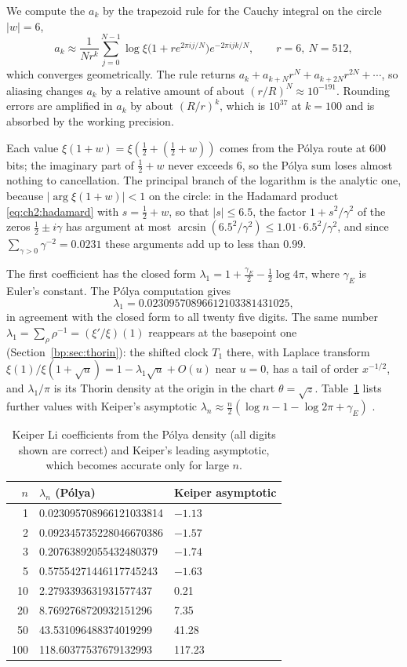 We compute the $a_k$ by the trapezoid rule for the Cauchy integral on the circle $|w|=6$,
\[
a_k\approx\frac1{Nr^k}\sum_{j=0}^{N-1}\log\xi\big(1+re^{2\pi ij/N}\big)e^{-2\pi ijk/N},\qquad r=6,\ N=512,
\]
which converges geometrically. The rule returns $a_k+a_{k+N}r^N+a_{k+2N}r^{2N}+\cdots$, so aliasing changes $a_k$ by a relative amount of about $(r/R)^N\approx10^{-191}$. Rounding errors are amplified in $a_k$ by about $(R/r)^k$, which is $10^{37}$ at $k=100$ and is absorbed by the working precision.

Each value $\xi(1+w)=\xi(\frac12+(\frac12+w))$ comes from the P\'olya route at $600$ bits; the imaginary part of $\frac12+w$ never exceeds $6$, so the P\'olya sum loses almost nothing to cancellation. The principal branch of the logarithm is the analytic one, because $|\arg\xi(1+w)|<1$ on the circle: in the Hadamard product \eqref{eq:ch2:hadamard} with $s=\frac12+w$, so that $|s|\le6.5$, the factor $1+s^2/\gamma^2$ of the zeros $\frac12\pm i\gamma$ has argument at most $\arcsin(6.5^2/\gamma^2)\le1.01\cdot6.5^2/\gamma^2$, and since $\sum_{\gamma>0}\gamma^{-2}=0.0231$ these arguments add up to less than $0.99$.

The first coefficient has the closed form $\lambda_1=1+\frac{\gamma_E}2-\frac12\log4\pi$, where $\gamma_E$ is Euler's constant. The P\'olya computation gives
\[
\lambda_1=0.02309570896612103381431025,
\]
in agreement with the closed form to all twenty five digits. The same number $\lambda_1=\sum_\rho\rho^{-1}=(\xi'/\xi)(1)$ reappears at the basepoint one (Section~\ref{bp:sec:thorin}): the shifted clock $T_1$ there, with Laplace transform $\xi(1)/\xi(1+\sqrt u)=1-\lambda_1\sqrt u+O(u)$ near $u=0$, has a tail of order $x^{-1/2}$, and $\lambda_1/\pi$ is its Thorin density at the origin in the chart $\theta=\sqrt z$. Table~\ref{tab:ch20:li} lists further values with Keiper's asymptotic $\lambda_n\approx\frac n2(\log n-1-\log2\pi+\gamma_E)$ \cite{Keiper92}.

\begin{table}[htbp]
\centering\small
\begin{tabular}{rll}
\toprule
$n$ & $\lambda_n$ (P\'olya) & Keiper asymptotic\\
\midrule
1 & 0.023095708966121033814 & $-1.13$\\
2 & 0.092345735228046670386 & $-1.57$\\
3 & 0.20763892055432480379 & $-1.74$\\
5 & 0.57554271446117745243 & $-1.63$\\
10 & 2.2793393631931577437 & 0.21\\
20 & 8.7692768720932151296 & 7.35\\
50 & 43.531096488374019299 & 41.28\\
100 & 118.60377537679132993 & 117.23\\
\bottomrule
\end{tabular}
\caption{Keiper Li coefficients from the P\'olya density (all digits shown are correct) and Keiper's leading asymptotic, which becomes accurate only for large $n$.}
\label{tab:ch20:li}
\end{table}

